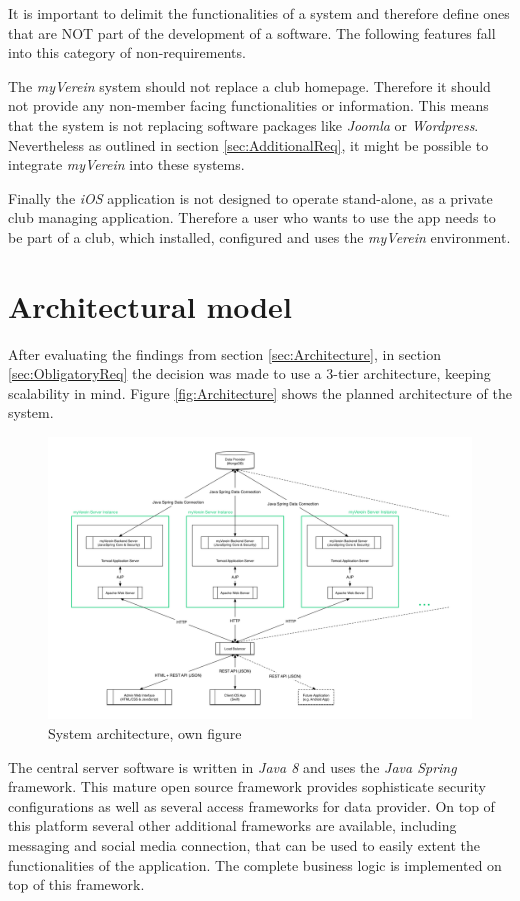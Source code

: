 It is important to delimit the functionalities of a system and therefore define ones that are NOT part of the development of a software. The following features fall into this category of non-requirements.

The \emph{myVerein} system should not replace a club homepage. Therefore it should not provide any non-member facing functionalities or information. This means that the system is not replacing software packages like \emph{Joomla} or \emph{Wordpress}. Nevertheless as outlined in section \vref{sec:AdditionalReq}, it might be possible to integrate \emph{myVerein} into these systems.

Finally the \emph{iOS} application is not designed to operate stand-alone, as a private club managing application. Therefore a user who wants to use the app needs to be part of a club, which installed, configured and uses the \emph{myVerein} environment.

\section{Architectural model}
After evaluating the findings from section \vref{sec:Architecture}, in section \vref{sec:ObligatoryReq} the decision was made to use a 3-tier architecture, keeping scalability in mind. Figure \vref{fig:Architecture} shows the planned architecture of the system. 

\begin{figure}[h]
  	\centering
  	\includegraphics[width=0.95\linewidth]{./images/architecture.png}
  	\caption{System architecture, own figure}
	\label{fig:Architecture}
\end{figure}

The central server software is written in \emph{Java 8} and uses the \emph{Java Spring} framework. This mature open source framework provides sophisticate security configurations as well as several access frameworks for data provider. On top of this platform several other additional frameworks are available, including messaging and social media connection, that can be used to easily extent the functionalities of the application. The complete business logic is implemented on top of this framework.

